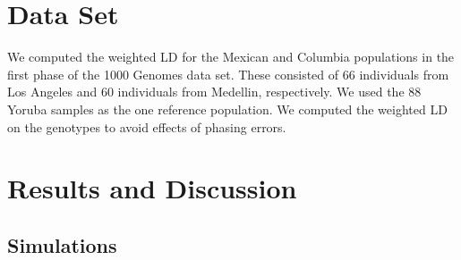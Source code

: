 \section{Data Set}
We computed the weighted LD for the Mexican and Columbia populations in the first phase of the 1000 Genomes data set. These consisted of 66 individuals from Los Angeles and 60 individuals from Medellin, respectively. We used the 88 Yoruba samples as the one reference population. We computed the weighted LD on the genotypes to avoid effects of phasing errors.
\section{Results and Discussion}
\subsection{Simulations}

